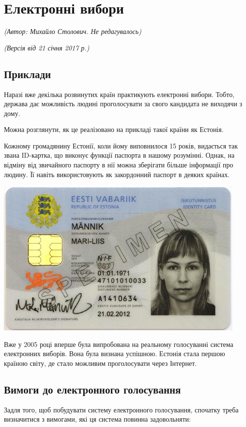 \section{Електронні вибори}
%
\begin{flushright}
\emph{(Автор: Михайло Столович. Не редагувалось)}
\par \emph{(Версія від 21 січня 2017 р.)}
\end{flushright}

\subsection{Приклади}

Наразі вже декілька розвинутих країн практикують електронні вибори. Тобто, держава дає можливість
людині проголосувати за свого кандидата не виходячи з дому.

Можна розглянути, як це реалізовано на прикладі такої країни як Естонія.

Кожному громадянину Естонії, коли йому виповнилося 15 років, видається так звана ID-картка, що виконує
функції паспорта в нашому розумінні. Однак, на відміну від звичайного паспорту в нії можна зберігати
більше інформації про людину. Її навіть використовують як закордонний паспорт в деяких країнах.

\includegraphics{idcard}

Вже у 2005 році вперше була випробована на реальному голосуванні система електронних виборів.
Вона була визнана успішною. 
Естонія стала першою країною світу, де стало можливим проголосувати через Інтернет. 

\subsection{Вимоги до електронного голосування}
Задля того, щоб побудувати систему електронного голосування, спочатку треба визначитися з вимогами, які
ця система повинна задовольняти:



